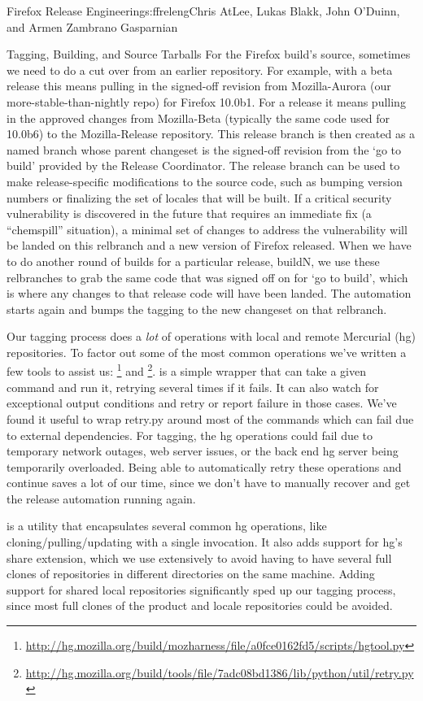\begin{aosachapter}{Firefox Release Engineering}{s:ffreleng}{Chris AtLee, Lukas Blakk, John O'Duinn, and Armen Zambrano Gasparnian}
\begin{aosasect1}{Tagging, Building, and Source Tarballs}
For the Firefox build's source, sometimes we need to do a cut over
from an earlier repository. For example, with a beta release this means
pulling in the signed-off revision from Mozilla-Aurora (our
more-stable-than-nightly repo) for Firefox 10.0b1. For a release it
means pulling in the approved changes from Mozilla-Beta (typically the
same code used for 10.0b6) to the Mozilla-Release repository.  This release
branch is then created as a named branch whose parent changeset is
the signed-off revision from the `go to build' provided by the Release
Coordinator. The release branch can be used to make release-specific
modifications to the source code, such as bumping version numbers or
finalizing the set of locales that will be built. If a critical
security vulnerability is discovered in the future that requires an
immediate fix (a ``chemspill'' situation), a minimal set of changes to
address the vulnerability will be landed on this relbranch and a new
version of Firefox released. When we have to do another round of
builds for a particular release, buildN, we use these relbranches to
grab the same code that was signed off on for `go to build', which is
where any changes to that release code will have been landed. The
automation starts again and bumps the tagging to the new changeset on
that relbranch.
    
Our tagging process does a \emph{lot} of operations with local and
remote Mercurial (hg) repositories. To factor out some of the most
common operations we've written a few tools to assist us:
\footnote{\url{http://hg.mozilla.org/build/mozharness/file/a0fce0162fd5/scripts/hgtool.py}}
and
\footnote{\url{http://hg.mozilla.org/build/tools/file/7adc08bd1386/lib/python/util/retry.py}}.
 is a simple wrapper that can take a given command and
run it, retrying several times if it fails. It can also watch for
exceptional output conditions and retry or report failure in those
cases. We've found it useful to wrap retry.py around most of the
commands which can fail due to external dependencies.  For tagging,
the hg operations could fail due to temporary network outages, web
server issues, or the back end hg server being temporarily
overloaded. Being able to automatically retry these operations and
continue saves a lot of our time, since we don't have to manually
recover and get the release automation running again.
    
 is a utility that encapsulates several common hg
operations, like cloning/pulling/updating with a single invocation. It
also adds support for hg's share extension, which we use extensively
to avoid having to have several full clones of repositories in
different directories on the same machine.  Adding support for shared
local repositories significantly sped up our tagging process, since most
full clones of the product and locale repositories could be avoided.
    

\end{aosasect1}
\end{aosachapter}
